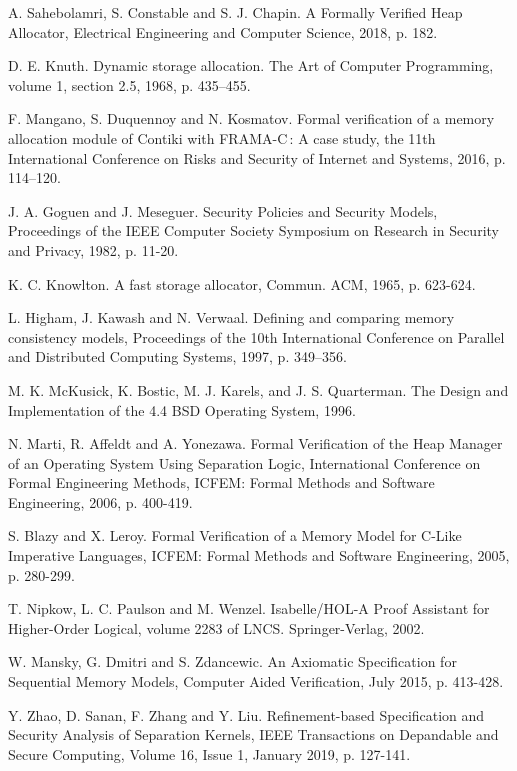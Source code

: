 \documentclass[10pt,conference,compsoc]{IEEEtran}
\begin{document}
\begin{thebibliography}{00}
	A. Sahebolamri, S. Constable and S. J. Chapin. A Formally Verified Heap Allocator, Electrical Engineering and Computer Science, 2018, p. 182.
	
	D. E. Knuth. Dynamic storage allocation. The Art of Computer Programming, volume 1, section 2.5, 1968, p. 435–455.
	
	F. Mangano, S. Duquennoy and N. Kosmatov. Formal verification of a memory allocation module of Contiki with FRAMA-C : A case study, the 11th International Conference on Risks and Security of Internet and Systems, 2016, p. 114–120.
	
	J. A. Goguen and J. Meseguer. Security Policies and Security Models, Proceedings of the IEEE Computer Society Symposium on Research in Security and Privacy, 1982, p. 11-20.
	
	K. C. Knowlton. A fast storage allocator, Commun. ACM, 1965, p. 623-624.
	
	L. Higham, J. Kawash and N. Verwaal. Defining and comparing memory consistency models, Proceedings of the 10th International Conference on Parallel and Distributed Computing Systems, 1997, p. 349–356.
	
	M. K. McKusick, K. Bostic, M. J. Karels, and J. S. Quarterman. The Design and Implementation of the 4.4 BSD Operating System, 1996.
	
	N. Marti, R. Affeldt and A. Yonezawa. Formal Verification of the Heap Manager of an Operating System Using Separation Logic, International Conference on Formal Engineering Methods, ICFEM: Formal Methods and Software Engineering, 2006, p. 400-419.
	
	S. Blazy and X. Leroy. Formal Verification of a Memory Model for C-Like Imperative Languages, ICFEM: Formal Methods and Software Engineering, 2005, p. 280-299.
	
	T. Nipkow, L. C. Paulson and M. Wenzel. Isabelle/HOL-A Proof Assistant for Higher-Order Logical, volume 2283 of LNCS. Springer-Verlag, 2002.
	
	W. Mansky, G. Dmitri and S. Zdancewic. An Axiomatic Specification for Sequential Memory Models, Computer Aided Verification, July 2015, p. 413-428.
	
	Y. Zhao, D. Sanan, F. Zhang and Y. Liu. Refinement-based Specification and Security Analysis of Separation Kernels, IEEE Transactions on Depandable and Secure Computing, Volume 16, Issue 1, January 2019, p. 127-141.
\end{thebibliography}
\end{document}
